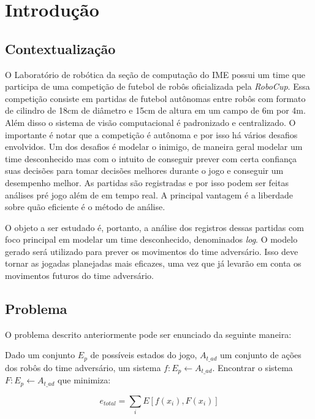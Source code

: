 \chapter{Introdução}

\section{Contextualização}

\par O Laboratório de robótica da seção de computação do IME possui um time que
participa de uma competição de futebol de robôs oficializada pela \textit{RoboCup}.
Essa competição consiste em partidas de futebol autônomas entre robôs com formato
de cilindro de 18cm de diâmetro e 15cm de altura em um campo de 6m por 4m. Além disso
o sistema de visão computacional é padronizado e centralizado. O importante é notar
que a competição é autônoma e por isso há vários desafios envolvidos.
Um dos desafios é modelar o inimigo, de maneira geral modelar um time desconhecido
mas com o intuito de conseguir prever com certa confiança suas decisões para tomar
decisões melhores durante o jogo e conseguir um desempenho melhor.
As partidas são registradas e por isso podem ser feitas análises pré jogo além
de em tempo real. A principal vantagem é a liberdade sobre quão eficiente é o método
de análise.

\par O objeto a ser estudado é, portanto, a análise dos registros dessas partidas 
com foco principal em modelar um time desconhecido, denominados \textit{log}. O modelo 
gerado será utilizado para prever os movimentos do time adversário. Isso deve tornar 
as jogadas planejadas mais  eficazes, uma vez que já levarão em conta os movimentos 
futuros do time adversário.

\section{Problema}

O problema descrito anteriormente pode ser enunciado da seguinte maneira:

Dado um conjunto $E_p$ de possíveis estados do jogo, $A_{t\_ad}$ um conjunto de ações dos robôs
do time adversário, um sistema $f: {E_p} \leftarrow {A_{t\_ad}}$. Encontrar o sistema 
$F: {E_p} \leftarrow {A_{t\_ad}}$ que minimiza:

\begin{equation}
e_{total} = \sum_i E[f(x_i),F(x_i)]
\end{equation}

